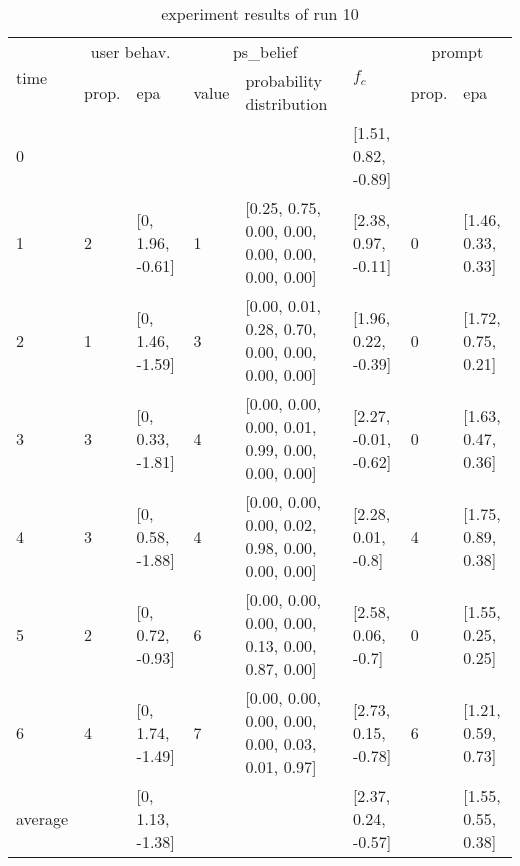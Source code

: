 \begin{table}[htbp]\footnotesize
\caption{experiment results of run 10}
\begin{tabular}{|p{0.4cm}|p{0.6cm}|l|p{0.6cm}|p{3.3cm}|l|p{0.6cm}|l|}
\hline

\multirow{2}{*}{time} & \multicolumn{2}{c|}{user behav.} & \multicolumn{2}{c|}{ps\_belief} &
\multirow{2}{*}{$f_c$} & \multicolumn{2}{c|}{prompt} \\ \cline{2-5}\cline{ 7- 8}
& prop. & epa & value & probability distribution &  & prop. & epa \\ \hline

0 & \multicolumn{1}{l|}{} &  & \multicolumn{1}{l|}{} &  & [1.51, 0.82, -0.89] & \multicolumn{1}{l|}{} &  \\ \hline
1 & 2 & [0, 1.96, -0.61] & 1 & [0.25, 0.75, 0.00, 0.00, 0.00, 0.00, 0.00, 0.00] & [2.38, 0.97, -0.11] & 0 & [1.46, 0.33, 0.33] \\ \hline
2 & 1 & [0, 1.46, -1.59] & 3 & [0.00, 0.01, 0.28, 0.70, 0.00, 0.00, 0.00, 0.00] & [1.96, 0.22, -0.39] & 0 & [1.72, 0.75, 0.21] \\ \hline
3 & 3 & [0, 0.33, -1.81] & 4 & [0.00, 0.00, 0.00, 0.01, 0.99, 0.00, 0.00, 0.00] & [2.27, -0.01, -0.62] & 0 & [1.63, 0.47, 0.36] \\ \hline
4 & 3 & [0, 0.58, -1.88] & 4 & [0.00, 0.00, 0.00, 0.02, 0.98, 0.00, 0.00, 0.00] & [2.28, 0.01, -0.8] & 4 & [1.75, 0.89, 0.38] \\ \hline
5 & 2 & [0, 0.72, -0.93] & 6 & [0.00, 0.00, 0.00, 0.00, 0.13, 0.00, 0.87, 0.00] & [2.58, 0.06, -0.7] & 0 & [1.55, 0.25, 0.25] \\ \hline
6 & 4 & [0, 1.74, -1.49] & 7 & [0.00, 0.00, 0.00, 0.00, 0.00, 0.03, 0.01, 0.97] & [2.73, 0.15, -0.78] & 6 & [1.21, 0.59, 0.73] \\ \hline
\multicolumn{1}{|l|}{average} & \multicolumn{1}{l|}{} & [0, 1.13, -1.38] & \multicolumn{1}{l|}{} &  & [2.37, 0.24, -0.57] & \multicolumn{1}{l|}{} & [1.55, 0.55, 0.38] \\ \hline
\end{tabular}
\label{}
\end{table}


